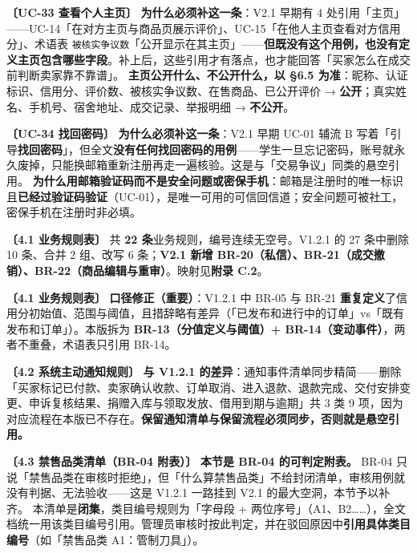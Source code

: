 \documentclass[12pt,a4paper]{ctexart}
\begin{document}
\vspace{0.35em}
{\small\textbf{〔UC-33 查看个人主页〕} \textbf{为什么必须补这一条}：V2.1 早期有 4 处引用「主页」——UC-14「在对方主页与商品页展示评价」、UC-15「在他人主页查看对方信用分」、术语表 \texttt{被核实争议数}「公开显示在其主页」——\textbf{但既没有这个用例，也没有定义主页包含哪些字段}。补上后，这些引用才有落点，也才能回答「买家怎么在成交前判断卖家靠不靠谱」。 \textbf{主页公开什么、不公开什么，以 §6.5 为准}：昵称、认证标识、信用分、评价数、被核实争议数、在售商品、已公开评价 → \textbf{公开}；真实姓名、手机号、宿舍地址、成交记录、举报明细 → \textbf{不公开}。}\par
\vspace{0.35em}
{\small\textbf{〔UC-34 找回密码〕} \textbf{为什么必须补这一条}：V2.1 早期 UC-01 辅流 B 写着「引导\textbf{找回密码}」，但全文\textbf{没有任何找回密码的用例}——学生一旦忘记密码，账号就永久废掉，只能换邮箱重新注册再走一遍核验。这是与「交易争议」同类的悬空引用。 \textbf{为什么用邮箱验证码而不是安全问题或密保手机}：邮箱是注册时的唯一标识且\textbf{已经过验证码验证}（UC-01），是唯一可用的可信回信道；安全问题可被社工，密保手机在注册时非必填。}\par
\vspace{0.35em}
{\small\textbf{〔4.1 业务规则表〕} 共 \textbf{22 条}业务规则，编号连续无空号。V1.2.1 的 27 条中删除 10 条、合并 2 组、改写 6 条；\textbf{V2.1 新增 BR-20（私信）、BR-21（成交撤销）、BR-22（商品编辑与重审）}。映射见\textbf{附录 C.2}。}\par
\vspace{0.35em}
{\small\textbf{〔4.1 业务规则表〕} \textbf{口径修正（重要）}：V1.2.1 中 BR-05 与 BR-21 \textbf{重复定义}了信用分初始值、范围与阈值，且措辞略有差异（「已发布和进行中的订单」vs「既有发布和订单」）。本版拆为 \textbf{BR-13（分值定义与阈值）+ BR-14（变动事件）}，两者不重叠，术语表只引用 BR-14。}\par
\vspace{0.35em}
{\small\textbf{〔4.2 系统主动通知规则〕} \textbf{与 V1.2.1 的差异}：通知事件清单同步精简——删除「买家标记已付款、卖家确认收款、订单取消、进入退款、退款完成、交付安排变更、申诉复核结果、捐赠入库与领取发放、借用到期与逾期」共 3 类 9 项，因为对应流程在本版已不存在。\textbf{保留通知清单与保留流程必须同步，否则就是悬空引用。}}\par
\vspace{0.35em}
{\small\textbf{〔4.3 禁售品类清单（BR-04 附表）〕} \textbf{本节是 BR-04 的可判定附表。} BR-04 只说「禁售品类在审核时拒绝」，但「什么算禁售品类」不给封闭清单，审核用例就没有判据、无法验收——这是 V1.2.1 一路挂到 V2.1 的最大空洞，本节予以补齐。 本清单是\textbf{闭集}，类目编号规则为「字母段 + 两位序号」（A1、B2……），全文档统一用该类目编号引用。管理员审核时按此判定，并在驳回原因中\textbf{引用具体类目编号}（如「禁售品类 A1：管制刀具」）。}\par
\end{document}
